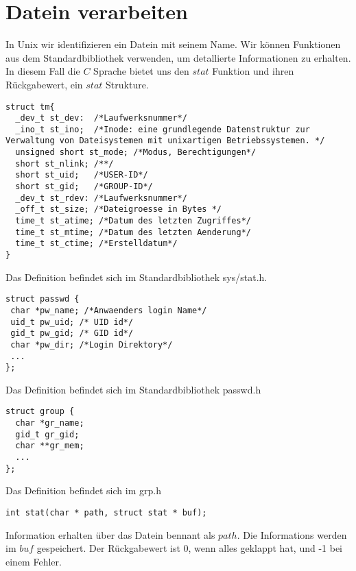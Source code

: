 \documentclass{article}[12pt]
\newenvironment{myexampleblock}[1]{%
    \tcolorbox[beamer,%
    noparskip,breakable,
    colback=White,colframe=ForestGreen,%
    colbacklower=LimeGreen!75!White,%
    title=#1]}%
    {\endtcolorbox}
\begin{document}
\section{Datein verarbeiten}
In Unix wir identifizieren ein Datein mit seinem Name. Wir können Funktionen aus dem Standardbibliothek verwenden, um
detallierte Informationen zu erhalten. In diesem Fall die $C$ Sprache bietet uns den $stat$ Funktion und ihren Rückgabewert,
ein $stat$ Strukture. 
\begin{myexampleblock}{Definition: \texttt{struct stat}}
\begin{lstlisting}
struct tm{
  _dev_t st_dev:  /*Laufwerksnummer*/
  _ino_t st_ino;  /*Inode: eine grundlegende Datenstruktur zur Verwaltung von Dateisystemen mit unixartigen Betriebssystemen. */
  unsigned short st_mode; /*Modus, Berechtigungen*/
  short st_nlink; /**/
  short st_uid;   /*USER-ID*/
  short st_gid;   /*GROUP-ID*/
  _dev_t st_rdev: /*Laufwerksnummer*/
  _off_t st_size; /*Dateigroesse in Bytes */
  time_t st_atime; /*Datum des letzten Zugriffes*/
  time_t st_mtime; /*Datum des letzten Aenderung*/
  time_t st_ctime; /*Erstelldatum*/
}
\end{lstlisting}
\vspace{-0.4cm}
Das Definition befindet sich im Standardbibliothek sys/stat.h.
\end{myexampleblock}
\begin{myexampleblock}{Definition: \texttt{struct passwd}}
\begin{lstlisting}
struct passwd {
 char *pw_name; /*Anwaenders login Name*/
 uid_t pw_uid; /* UID id*/
 gid_t pw_gid; /* GID id*/
 char *pw_dir; /*Login Direktory*/
 ...
}; 
\end{lstlisting}
\vspace{-0.4cm}
Das Definition befindet sich im Standardbibliothek passwd.h
\end{myexampleblock}
\begin{myexampleblock}{Definition: \texttt{struct group}}
\begin{lstlisting}
struct group {
  char *gr_name;
  gid_t gr_gid;
  char **gr_mem;
  ...
};
\end{lstlisting}
\vspace{-0.4cm}
Das Definition befindet sich im grp.h
\end{myexampleblock}
\begin{myexampleblock}{Funktion: \texttt{stat}}
\begin{lstlisting}
int stat(char * path, struct stat * buf);
\end{lstlisting}
\vspace{-.4cm}
Information erhalten über das Datein bennant als $path$. Die Informations werden im $buf$ gespeichert.
Der Rückgabewert ist 0, wenn alles geklappt hat, und -1 bei einem Fehler.
\end{myexampleblock}
\end{document}
